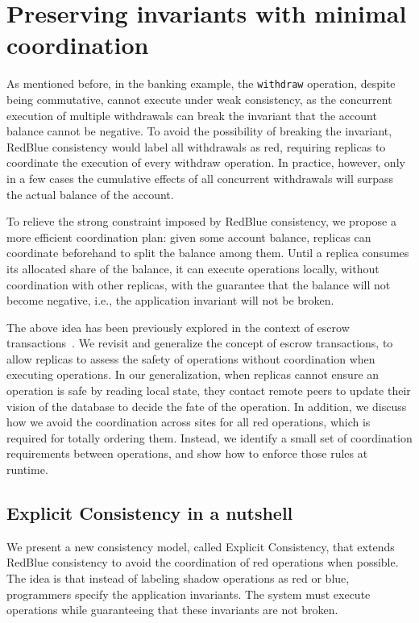 \documentclass[11pt,dvipdfm]{article}
\begin{document}
\section{Preserving invariants with minimal coordination}
\label{sec:indigo}
As mentioned before, in the banking example, the {\tt withdraw} operation, despite
being commutative, cannot execute under weak consistency, as the concurrent
execution of multiple withdrawals can break the invariant that
the account balance cannot be negative. To avoid the possibility of breaking the invariant, RedBlue consistency would
label all withdrawals as red, requiring replicas to coordinate
the execution of every withdraw operation. In practice, however, only in a few cases the cumulative effects of all concurrent withdrawals
will surpass the actual balance of the account.

To relieve the strong constraint imposed by RedBlue consistency, we propose a more efficient
coordination plan: given some
account balance, replicas can coordinate beforehand to split the balance
among them. Until a replica consumes its allocated
share of the balance, it can execute operations locally, without
coordination with other replicas, with the guarantee that
the balance will not become negative, i.e., the application invariant will
not be broken.

The above idea has been previously explored in the
context of escrow transactions~\cite{BarbaraMilla1994Demarcation,ONeil1986Escrow}.
We revisit and generalize the concept of escrow transactions, to allow replicas to
assess the safety of operations without coordination when executing operations.
In our generalization, when replicas cannot ensure an operation is safe by
reading local state, they contact remote peers to update their vision of the
database to decide the fate of the operation.
In addition, we discuss how we avoid the coordination across sites for
all red operations, which is required for totally ordering them. Instead,
we identify a small set of coordination requirements between operations, and show
how to enforce those rules at runtime.

\subsection{Explicit Consistency in a nutshell}
We present a new consistency model, called Explicit Consistency, that extends
RedBlue consistency to avoid the coordination of red operations when possible.
The idea is that instead of labeling shadow operations as red or blue,
programmers specify the application invariants.
The system must execute operations while guaranteeing that these invariants are
not broken.
\end{document}
